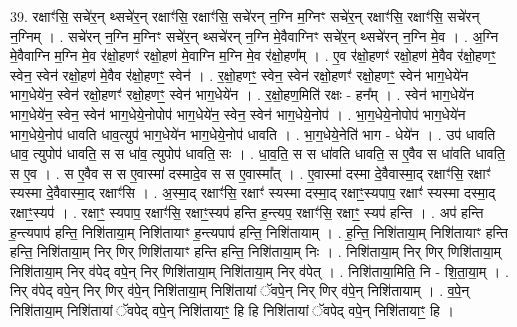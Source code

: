 \documentclass[17pt]{extarticle}
\begin{document}
39. रक्षाꣳ॑सि॒ सचे॑र॒न् थ्सचे॑र॒न् रक्षाꣳ॑सि॒ रक्षाꣳ॑सि॒ सचे॑रन् न॒ग्नि म॒ग्निꣳ सचे॑र॒न् रक्षाꣳ॑सि॒ रक्षाꣳ॑सि॒ सचे॑रन् न॒ग्निम् । . सचे॑रन् न॒ग्नि म॒ग्निꣳ सचे॑र॒न् थ्सचे॑रन् न॒ग्नि मे॒वैवाग्निꣳ सचे॑र॒न् थ्सचे॑रन् न॒ग्नि मे॒व । . अ॒ग्नि मे॒वैवाग्नि म॒ग्नि मे॒व र॑क्षो॒हणꣳ॑ रक्षो॒हण॑ मे॒वाग्नि म॒ग्नि मे॒व र॑क्षो॒हण᳚म् । . ए॒व र॑क्षो॒हणꣳ॑ रक्षो॒हण॑ मे॒वैव र॑क्षो॒हणꣳ॒॒ स्वेन॒ स्वेन॑ रक्षो॒हण॑ मे॒वैव र॑क्षो॒हणꣳ॒॒ स्वेन॑ । . र॒क्षो॒हणꣳ॒॒ स्वेन॒ स्वेन॑ रक्षो॒हणꣳ॑ रक्षो॒हणꣳ॒॒ स्वेन॑ भाग॒धेये॑न भाग॒धेये॑न॒ स्वेन॑ रक्षो॒हणꣳ॑ रक्षो॒हणꣳ॒॒ स्वेन॑ भाग॒धेये॑न । . र॒क्षो॒हण॒मिति॑ रक्षः - हन᳚म् । . स्वेन॑ भाग॒धेये॑न भाग॒धेये॑न॒ स्वेन॒ स्वेन॑ भाग॒धेये॒नोपोप॑ भाग॒धेये॑न॒ स्वेन॒ स्वेन॑ भाग॒धेये॒नोप॑ । . भा॒ग॒धेये॒नोपोप॑ भाग॒धेये॑न भाग॒धेये॒नोप॑ धावति धाव॒त्युप॑ भाग॒धेये॑न भाग॒धेये॒नोप॑ धावति । . भा॒ग॒धेये॒नेति॑ भाग - धेये॑न । . उप॑ धावति धाव॒ त्युपोप॑ धावति॒ स स धा॑व॒ त्युपोप॑ धावति॒ सः । . धा॒व॒ति॒ स स धा॑वति धावति॒ स ए॒वैव स धा॑वति धावति॒ स ए॒व । . स ए॒वैव स स ए॒वास्मा॑ दस्मादे॒व स स ए॒वास्मा᳚त् । . ए॒वास्मा॑ दस्मा दे॒वैवास्मा॒द् रक्षाꣳ॑सि॒ रक्षाꣳ॑ स्यस्मा दे॒वैवास्मा॒द् रक्षाꣳ॑सि । . अ॒स्मा॒द् रक्षाꣳ॑सि॒ रक्षाꣳ॑ स्यस्मा दस्मा॒द् रक्षाꣳ॒॒स्यपाप॒ रक्षाꣳ॑ स्यस्मा दस्मा॒द् रक्षाꣳ॒॒स्यप॑ । . रक्षाꣳ॒॒ स्यपाप॒ रक्षाꣳ॑सि॒ रक्षाꣳ॒॒स्यप॑ हन्ति ह॒न्त्यप॒ रक्षाꣳ॑सि॒ रक्षाꣳ॒॒ स्यप॑ हन्ति । . अप॑ हन्ति ह॒न्त्यपाप॑ हन्ति॒ निशि॑ताया॒म् निशि॑तायाꣳ ह॒न्त्यपाप॑ हन्ति॒ निशि॑तायाम् । . ह॒न्ति॒ निशि॑ताया॒म् निशि॑तायाꣳ हन्ति हन्ति॒ निशि॑ताया॒म् निर् णिर् णिशि॑तायाꣳ हन्ति हन्ति॒ निशि॑ताया॒म् निः । . निशि॑ताया॒म् निर् णिर् णिशि॑ताया॒म् निशि॑ताया॒म् निर् व॑पेद् वपे॒न् निर् णिशि॑ताया॒म् निशि॑ताया॒म् निर् व॑पेत् । . निशि॑ताया॒मिति॒ नि - शि॒ता॒या॒म् । . निर् व॑पेद् वपे॒न् निर् णिर् व॑पे॒न् निशि॑ताया॒म् निशि॑तायां ॅवपे॒न् निर् णिर् व॑पे॒न् निशि॑तायाम् । . व॒पे॒न् निशि॑ताया॒म् निशि॑तायां ॅवपेद् वपे॒न् निशि॑तायाꣳ॒॒ हि हि निशि॑तायां ॅवपेद् वपे॒न् निशि॑तायाꣳ॒॒ हि । \newline
\pagebreak
{}
\end{document}

